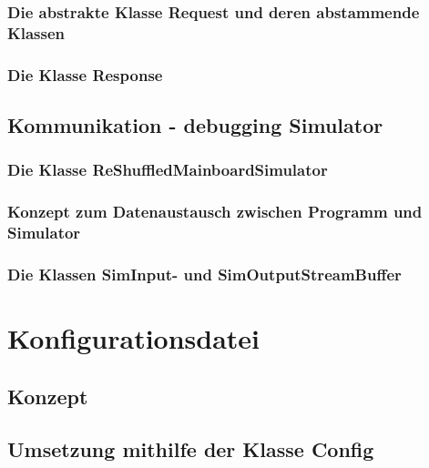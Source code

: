 \subsubsection{Die abstrakte Klasse Request und deren abstammende Klassen}
\subsubsection{Die Klasse Response}

\subsection{Kommunikation - debugging Simulator}

\subsubsection{Die Klasse ReShuffledMainboardSimulator}
\subsubsection{Konzept zum Datenaustausch zwischen Programm und Simulator}
\subsubsection{Die Klassen SimInput- und SimOutputStreamBuffer}

\section{Konfigurationsdatei}
\label{sec:config}
\subsection{Konzept}
\subsection{Umsetzung mithilfe der Klasse Config}
